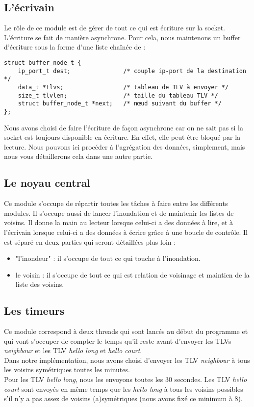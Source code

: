 \documentclass{FR16}
\begin{document}
\subsection{L'écrivain}
\label{ecrivain}
Le rôle de ce module est de gérer de tout ce qui est écriture sur la socket. L'écriture se fait de manière asynchrone. Pour cela, nous maintenons un buffer d'écriture sous la forme d'une liste chaînée de :
\begin{verbatim}
struct buffer_node_t {
    ip_port_t dest;               /* couple ip-port de la destination */
    data_t *tlvs;                 /* tableau de TLV à envoyer */
    size_t tlvlen;                /* taille du tableau TLV */
    struct buffer_node_t *next;   /* nœud suivant du buffer */
};
\end{verbatim}
Nous avons choisi de faire l'écriture de façon asynchrone car on ne sait pas si la socket est toujours disponible en écriture. En effet, elle peut être bloqué par la lecture. Nous pouvons ici procéder à l'agrégation des données, simplement, mais nous vous détaillerons cela dans une autre partie.

\subsection{Le noyau central}
Ce module s'occupe de répartir toutes les tâches à faire entre les différents modules. Il s'occupe aussi de lancer l'inondation et de maintenir les listes de voisins. Il donne la main au lecteur lorsque celui-ci a des données à lire, et à l'écrivain lorsque celui-ci a des données à écrire grâce à une boucle de contrôle. Il est séparé en deux parties qui seront détaillées plus loin :
\begin{itemize}
    \item "l'inondeur" : il s'occupe de tout ce qui touche à l'inondation.
    \item le voisin : il s'occupe de tout ce qui est relation de voisinage et maintien de la liste des voisins.
\end{itemize}

\subsection{Les timeurs}
Ce module correspond à deux threads qui sont lancés au début du programme et qui vont s'occuper de compter le temps qu'il reste avant d'envoyer les TLVs \textit{neighbour} et les TLV \textit{hello long} et \textit{hello court}.\\
Dans notre implémentation, nous avons choisi d'envoyer les TLV \textit{neighbour} à tous les voisins symétriques toutes les minutes.\\
Pour les TLV \textit{hello long}, nous les envoyons toutes les 30 secondes. Les TLV \textit{hello court} sont envoyés en même temps que les \textit{hello long} à tous les voisins possibles s'il n'y a pas assez de voisins (a)symétriques (nous avons fixé ce minimum à 8). \\
\end{document}
